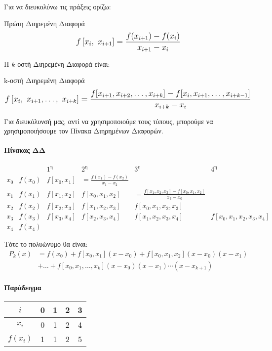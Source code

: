 \documentclass[11pt,a4paper,notitlepage,fleqn]{article}
\begin{document}
 	Για να διευκολύνω τις πράξεις ορίζω:
 	\begin{defn}{Πρώτη Διηρεμένη Διαφορά}{}
 		\[
 		\mathlarger{
 		f\left[x_i,\ x_{i+1}\right] =
 		\frac{f(x_{i+1})-f(x_i)}{x_{i+1}-x_i}
 	    }
 		\]
 	\end{defn}
 	
 	Η \( k \)-οστή Διηρεμένη Διαφορά είναι:
 	\begin{defn}{k-οστή Διηρεμένη Διαφορά}{}
 		\[
 		\mathlarger{
 			f\left[x_i,\ x_{i+1}, \dots,\ x_{i+k}\right] =
 			\frac{
 				f[x_{i+1},x_{i+2},\dots,x_{i+k}]
 				- f[x_i,x_{i+1},\dots,x_{i+k-1}]
 				}{x_{i+k}-x_i}
 		}
 		\]
 	\end{defn}
 	
 	Για διευκόλυνσή μας, αντί να χρησιμοποιούμε τους τύπους, μπορούμε
 	να χρησιμοποιήσουμε τον Πίνακα Διηρημένων Διαφορών.
 	
 	\paragraph{Πίνακας ΔΔ}
 	\[
 	\begin{array}{llllll}
 	 & & 1^{\text{η}} & 2^\text{η} & 3^\text{η} & 4^\text{η}\\
 	x_0 & f(x_0) & f[x_0,x_1] & = \frac{f(x_1)-f(x_2)}{x_1-x_2} & \\
 	x_1 & f(x_1) & f[x_1,x_2] & f[x_0,x_1,x_2] & =
 	\frac{f[x_1,x_2,x_3]-f[x_0,x_1,x_2]}{x_3-x_0} \\
 	x_2 & f(x_2) & f[x_2,x_3] & f[x_1,x_2,x_3] & f[x_0,x_1,x_2,x_3]\\
 	x_3 & f(x_3) & f[x_3,x_4] & f[x_2,x_3,x_4] & f[x_1,x_2,x_3,x_4]
 	& f[x_0,x_1,x_2,x_3,x_4]
 	\\
 	x_4 & f(x_4) & &
 	\end{array}
 	\]
 	
 	Τότε το πολυώνυμο θα είναι:
 	\begin{align*}
 		P_k(x) &= f(x_0) + f[x_0,x_1](x-x_0) +
 		f[x_0,x_1,x_2](x-x_0)(x-x_1)
 		\\ & + \dots +
 		f[x_0,x_1,\dots,x_k](x-x_0)(x-x_1)\cdots(x-x_{k+1})
 	\end{align*}
 	
 	\paragraph{Παράδειγμα}
 	\hspace{0pt}
 	
 	\begin{tabular}{|c|c|c|c|c|}
 		\hline 
 		\(i\) & 0 & 1 & 2 & 3 \\ 
 		\hline 
 		\(x_i\) & 0 & 1 & 2 & 4 \\ 
 		\hline 
 		\(f(x_i)\) & 1 & 1 & 2 & 5 \\ 
 		\hline 
 	\end{tabular}
 	
\end{document}

